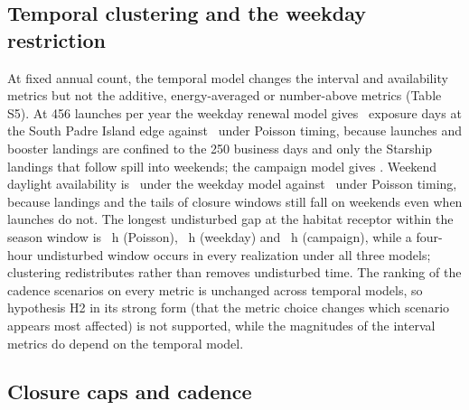 \documentclass[preprint,12pt,authoryear]{elsarticle}
\begin{document}
\subsection{Temporal clustering and the weekday restriction}

At fixed annual count, the temporal model changes the interval and availability metrics but not the additive, energy-averaged or number-above metrics (Table S5). At 456 launches per year the weekday renewal model gives \valETwoWeekdayDaysNineZeroSpi~exposure days at the South Padre Island edge against \valETwoPoissonDaysNineZeroSpi~under Poisson timing, because launches and booster landings are confined to the 250 business days and only the Starship landings that follow spill into weekends; the campaign model gives \valETwoCampaignDaysNineZeroSpi. Weekend daylight availability is \valETwoWeekdayWeekendAvail~under the weekday model against \valETwoPoissonWeekendAvail~under Poisson timing, because landings and the tails of closure windows still fall on weekends even when launches do not. The longest undisturbed gap at the habitat receptor within the season window is \valETwoPoissonLongestGapHabitatH~h (Poisson), \valETwoWeekdayLongestGapHabitatH~h (weekday) and \valETwoCampaignLongestGapHabitatH~h (campaign), while a four-hour undisturbed window occurs in every realization under all three models; clustering redistributes rather than removes undisturbed time. The ranking of the cadence scenarios on every metric is unchanged across temporal models, so hypothesis H2 in its strong form (that the metric choice changes which scenario appears most affected) is not supported, while the magnitudes of the interval metrics do depend on the temporal model.

\subsection{Closure caps and cadence}
\label{sec:closures}
\end{document}

